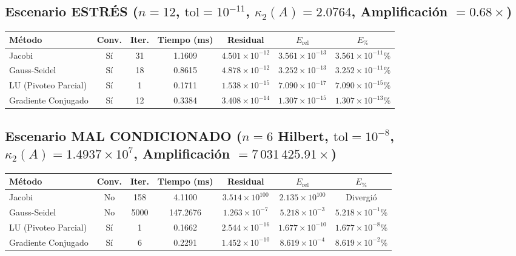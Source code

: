 \documentclass[11pt,a4paper]{article}
\begin{document}
\subsection{Escenario ESTRÉS ($n=12$, $\text{tol}=10^{-11}$, $\kappa_2(A)=2.0764$, Amplificación $=0.68\times$)}
\begin{table}[h!]
\centering
\begin{tabular}{lcccccc}
\toprule
\textbf{Método} & \textbf{Conv.} & \textbf{Iter.} & \textbf{Tiempo (ms)} & \textbf{Residual} & $E_{\text{rel}}$ & $E_{\%}$ \\
\midrule
Jacobi & Sí & 31 & 1.1609 & $4.501\times 10^{-12}$ & $3.561\times 10^{-13}$ & $3.561\times 10^{-11}\%$ \\
Gauss-Seidel & Sí & 18 & 0.8615 & $4.878\times 10^{-12}$ & $3.252\times 10^{-13}$ & $3.252\times 10^{-11}\%$ \\
LU (Pivoteo Parcial) & Sí & 1 & 0.1711 & $1.538\times 10^{-15}$ & $7.090\times 10^{-17}$ & $7.090\times 10^{-15}\%$ \\
Gradiente Conjugado & Sí & 12 & 0.3384 & $3.408\times 10^{-14}$ & $1.307\times 10^{-15}$ & $1.307\times 10^{-13}\%$ \\
\bottomrule
\end{tabular}
\end{table}

\subsection{Escenario MAL CONDICIONADO ($n=6$ Hilbert, $\text{tol}=10^{-8}$, $\kappa_2(A)=1.4937\times 10^7$, Amplificación $=7\,031\,425.91\times$)}
\begin{table}[h!]
\centering
\begin{tabular}{lcccccc}
\toprule
\textbf{Método} & \textbf{Conv.} & \textbf{Iter.} & \textbf{Tiempo (ms)} & \textbf{Residual} & $E_{\text{rel}}$ & $E_{\%}$ \\
\midrule
Jacobi & No & 158 & 4.1100 & $3.514\times 10^{100}$ & $2.135\times 10^{100}$ & Divergió \\
Gauss-Seidel & No & 5000 & 147.2676 & $1.263\times 10^{-7}$ & $5.218\times 10^{-3}$ & $5.218\times 10^{-1}\%$ \\
LU (Pivoteo Parcial) & Sí & 1 & 0.1662 & $2.544\times 10^{-16}$ & $1.677\times 10^{-10}$ & $1.677\times 10^{-8}\%$ \\
Gradiente Conjugado & Sí & 6 & 0.2291 & $1.452\times 10^{-10}$ & $8.619\times 10^{-4}$ & $8.619\times 10^{-2}\%$ \\
\bottomrule
\end{tabular}
\end{table}
\end{document}
